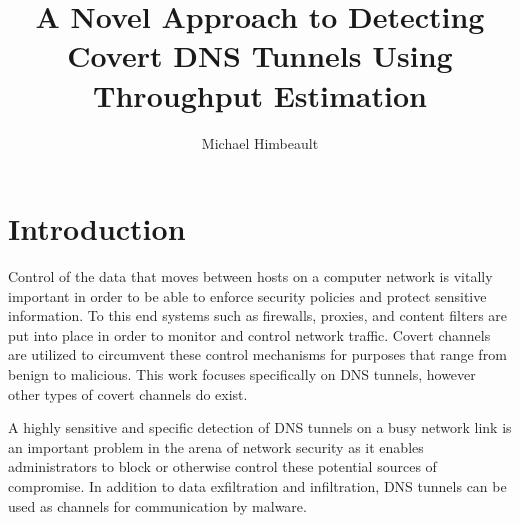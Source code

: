 \documentclass{llncs}
\begin{document}
%
\title{A Novel Approach to Detecting Covert DNS Tunnels Using Throughput Estimation}
\author{Michael Himbeault}
\maketitle


\smallskip
{}

\section{Introduction}
Control of the data that moves between hosts on a computer network is vitally
important in order to be able to enforce security policies and protect sensitive
information. To this end systems such as firewalls, proxies, and content filters
are put into place in order to monitor and control network traffic. Covert
channels are utilized to circumvent these control mechanisms for purposes that
range from benign\cite{sans-dnshash} to malicious. This work focuses
specifically on DNS tunnels, however other types of covert channels do exist.


A highly sensitive and specific detection of DNS tunnels on a busy network link
is an important problem in the arena of network security as it enables
administrators to block or otherwise control these potential sources of
compromise. In addition to data exfiltration and infiltration, DNS tunnels can
be used as channels for communication by malware\cite{Dietrich2011}.
\end{document}
